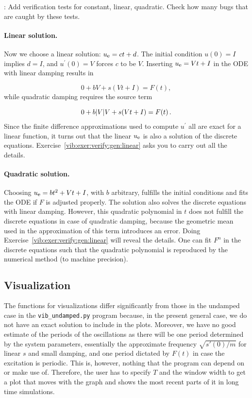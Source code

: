 \documentclass[%
oneside,                 %
final,                   %
10pt]{article}
\newcommand{\longinlinecomment}[3]{{\color{red}{\bf #1}: #2}}
\begin{document}
\longinlinecomment{hpl 8}{ Add verification tests for constant, linear, quadratic. Check how many bugs that are caught by these tests. }{ Add verification tests for }

\paragraph{Linear solution.}
Now we choose a linear solution: $\uex = ct + d$. The initial condition
$u(0)=I$ implies $d=I$, and $u^{\prime}(0)=V$ forces $c$ to be $V$.
Inserting $\uex=Vt+I$ in the ODE with linear damping results in

\[ 0 + bV + s(Vt+I) = F(t),\]
while quadratic damping requires the source term

\[ 0 + b|V|V + s(Vt+I) = F(t)\tp\]
Since the finite difference approximations used to compute $u^{\prime}$ all
are exact for a linear function, it turns out that the linear $\uex$
is also a solution of the discrete equations.
Exercise~\ref{vib:exer:verify:gen:linear} asks you to carry out
all the details.

\paragraph{Quadratic solution.}
Choosing $\uex = bt^2 + Vt + I$, with $b$ arbitrary,
fulfills the initial conditions and
fits the ODE if $F$ is adjusted properly. The solution also solves
the discrete equations with linear damping. However, this quadratic
polynomial in $t$ does not fulfill the discrete equations in case
of quadratic damping, because the geometric mean used in the approximation
of this term introduces an error.
Doing Exercise~\ref{vib:exer:verify:gen:linear} will reveal
the details. One can fit $F^n$ in the discrete equations such that
the quadratic polynomial is reproduced by the numerical method (to
machine precision).


\subsection{Visualization}
\label{vib:ode2:viz}

The functions for visualizations differ significantly from
those in the undamped case in the \Verb!vib_undamped.py! program because,
in the present general case, we do not have an exact solution to
include in the plots. Moreover, we have no good estimate of
the periods of the oscillations as there will be one period
determined by the system parameters, essentially the
approximate frequency $\sqrt{s'(0)/m}$ for linear $s$ and small damping,
and one period dictated by $F(t)$ in case the excitation is periodic.
This is, however,
nothing that the program can depend on or make use of.
Therefore, the user has to specify $T$ and the window width
to get a plot that moves with the graph and shows
the most recent parts of it in long time simulations.
\end{document}
